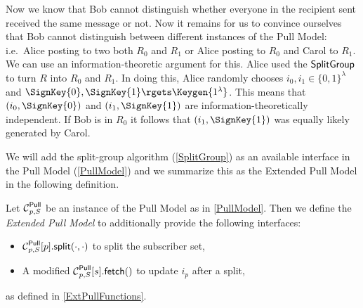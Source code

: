 Now we know that Bob cannot distinguish whether everyone in the recipient sent 
received the same message or not.
Now it remains for us to convince ourselves that Bob cannot distinguish between
different instances of the Pull Model: i.e.\ Alice posting to two both \(R_0\) 
and \(R_1\) or Alice posting to \(R_0\) and Carol to \(R_1\).
We can use an information-theoretic argument for this.
Alice used the \(\operatorname{\mathsf{SplitGroup}}\) to turn \(R\) into \(R_0\) and \(R_1\).
In doing this, Alice randomly chooses \(i_0, i_1\in \{0, 1\}^\lambda\) and 
\(\SignKey{0}, \SignKey{1}\rgets \Keygen{1^\lambda}\).
This means that \((i_0, \SignKey{0})\) and \((i_1, \SignKey{1})\) are 
information-theoretically independent.
If Bob is in \(R_0\) it follows that \((i_1, \SignKey{1})\) was equally likely 
generated by Carol.

We will add the split-group algorithm (\cref{SplitGroup}) as an available 
interface in the Pull Model (\cref{PullModel}) and we summarize this as the 
Extended Pull Model in the following definition.

\begin{definition}\label{ExtPullModel}
  Let \(\Pull[p, S]\) be an instance of the Pull Model as in \cref{PullModel}.
  Then we define the \emph{Extended Pull Model} to additionally provide the 
  following interfaces:
  \begin{itemize}
    \item \(\psplit[p, S]{p}[\cdot, \cdot]\) to split the subscriber set,
    \item A modified \(\pget[p, S]{s}[]\) to update \(i_p\) after a split,
  \end{itemize}
  as defined in \cref{ExtPullFunctions}.
\end{definition}

